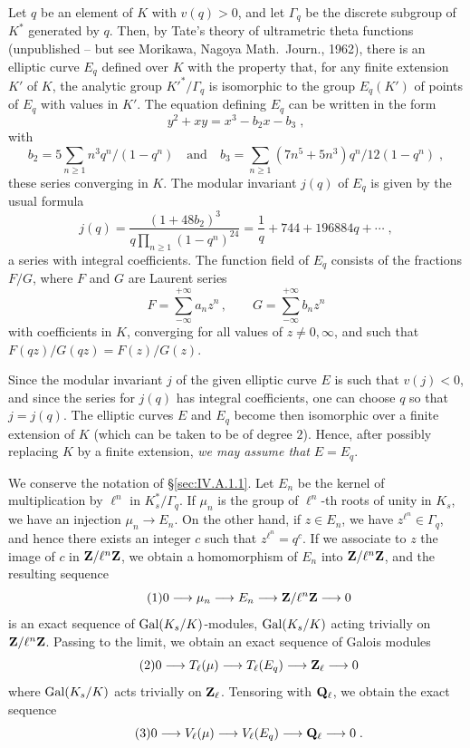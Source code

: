 Let $q$ be an element of $K$ with $v(q)>0$, and let $\Gamma_q$ be the
discrete subgroup of $K^*$ generated by $q$. Then, by Tate's theory of
ultrametric theta functions (unpublished -- but see Morikawa, Nagoya
Math.~Journ., 1962), there is an elliptic curve $E_q$ defined over $K$
with the property that, for any finite extension $K'$ of $K$, the
analytic group $K'^*/\Gamma_q$ is isomorphic to the group $E_q(K')$ of
points of $E_q$ with values in $K'$. The equation defining $E_q$ can be
written in the form
\[
y^2 + xy = x^3 - b_2x - b_3\;,
\]
with
\[
b_2 = 5\sum_{n\ge 1} n^3q^n/(1-q^n)
\quad\text{and}\quad
b_3 = \sum_{n\ge 1} (7n^5+5n^3)q^n/12(1-q^n)\;,
\]
these series converging in $K$. The modular invariant $j(q)$ of $E_q$ is
given by the usual formula
\[
j(q) = \frac{(1+48b_2)^3}{q\prod_{n\ge 1}(1-q^n)^{24}}
     = \frac{1}{q} + 744 + 196884q + \dotsb\;,
\]
a series with integral coefficients. The function field of $E_q$ consists
of the fractions $F/G$, where $F$ and $G$ are Laurent series
\[
F = \sum_{-\infty}^{+\infty} a_nz^n\,,\qquad
G = \sum_{-\infty}^{+\infty} b_nz^n
\]
with coefficients in $K$, converging for all values of $z\neq 0,\infty$,
and such that $F(qz)/G(qz) = F(z)/G(z)$.

Since the modular invariant $j$ of the given elliptic curve $E$ is such
that $v(j)<0$, and since the series for $j(q)$ has integral coefficients,
one can choose $q$ so that $j=j(q)$. The elliptic curves $E$ and $E_q$
become then isomorphic over a finite extension of $K$ (which can be taken
to be of degree $2$). Hence, after possibly replacing $K$ by a finite
extension, \emph{we may assume that} $E=E_q$.


We conserve the notation of \S\ref{sec:IV.A.1.1}. Let $E_n$ be the kernel
of multiplication by $\ell^n$ in $K_s^*/\Gamma_q$. If $\mu_n$ is the
group of $\ell^n$-th roots of unity in $K_s$, we have an injection
$\mu_n\longrightarrow E_n$. On the other hand, if $z\in E_n$, we have
$z^{\ell^n}\in\Gamma_q$, and hence there exists an integer $c$ such that
$z^{\ell^n}=q^c$. If we associate to $z$ the image of $c$ in
$\mathbf{Z}/\ell^n\mathbf{Z}$, we obtain a homomorphism of $E_n$ into $\mathbf{Z}/\ell^n\mathbf{Z}$, and
the resulting sequence
\begin{equation}
\tag{1}\label{eq:IV.A.1.2.1}
0 \longrightarrow \mu_n \longrightarrow E_n
   \longrightarrow \mathbf{Z}/\ell^n\mathbf{Z} \longrightarrow 0
\end{equation}
is an exact sequence of $\mathrm{Gal}(K_s/K)$-modules, $\mathrm{Gal}(K_s/K)$ acting
trivially on $\mathbf{Z}/\ell^n\mathbf{Z}$. Passing to the limit, we obtain an exact
sequence of Galois modules
\begin{equation}
\tag{2}\label{eq:IV.A.1.2.2}
0 \longrightarrow T_\ell(\mu) \longrightarrow T_\ell(E_q)
   \longrightarrow \mathbf{Z}_\ell \longrightarrow 0
\end{equation}
where $\mathrm{Gal}(K_s/K)$ acts trivially on $\mathbf{Z}_\ell$. Tensoring with
$\mathbf{Q}_\ell$, we obtain the exact sequence
\begin{equation}
\tag{3}\label{eq:IV.A.1.2.3}
0 \longrightarrow V_\ell(\mu) \longrightarrow V_\ell(E_q)
   \longrightarrow \mathbf{Q}_\ell \longrightarrow 0\;.
\end{equation}

